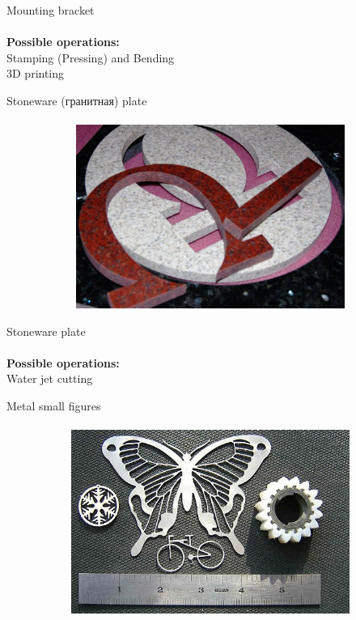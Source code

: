 \documentclass[aspectratio=169]{beamer}
\begin{document}
\begin{frame}[c]{Mounting bracket}
    \framesubtitle{}
        \LARGE \centering
        \textbf{Possible operations: } \\ 
        Stamping (Pressing) and Bending\\
        3D printing
    \end{frame}

\begin{frame}[c]{Stoneware (гранитная) plate}
\framesubtitle{}
    \vspace{-0.6cm}
    \begin{figure}[H]
        \centering\includegraphics[height=6cm,width=1\textwidth,keepaspectratio]{water.jpg}
        \label{fig:water.jpg}
    \end{figure}
\end{frame}

\begin{frame}[c]{Stoneware plate}
    \framesubtitle{}
        \LARGE \centering
        \textbf{Possible operations: } \\ 
        Water jet cutting\\
    \end{frame}

\begin{frame}[c]{Metal small figures}
\framesubtitle{}
    \vspace{-0.6cm}
    \begin{figure}[H]
        \centering\includegraphics[height=6cm,width=1\textwidth,keepaspectratio]{lazer.jpeg}
        \label{fig:lazer.jpeg}
    \end{figure}
\end{frame}
\end{document}
